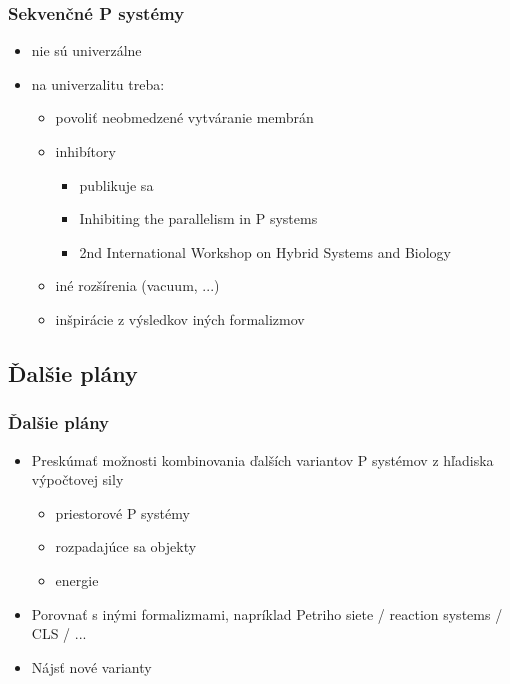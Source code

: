 \begin{frame}[t]\frametitle{Sekvenčné P systémy}
\begin{itemize}
  \item nie sú univerzálne
  \item na univerzalitu treba:
  \begin{itemize}
    \item povoliť neobmedzené vytváranie membrán \cite{Dang:2005:Sequential}
    \item inhibítory
      \begin{itemize}
        \item publikuje sa
        \item Inhibiting the parallelism in P systems
        \item 2nd International Workshop on Hybrid Systems and Biology
      \end{itemize}
    \item iné rozšírenia (vacuum, ...)
    \item inšpirácie z výsledkov iných formalizmov
  \end{itemize}
\end{itemize}
\end{frame}
\note{}


\subsection{Ďalšie plány} %
\label{sub:dalsie_plany}

\begin{frame}[t]\frametitle{Ďalšie plány}
\begin{itemize}
  \item Preskúmať možnosti kombinovania ďalších variantov P systémov z hľadiska výpočtovej sily
  \begin{itemize}
    \item priestorové P systémy
    \item rozpadajúce sa objekty
    \item energie
  \end{itemize}
  \item Porovnať s inými formalizmami, napríklad Petriho siete / reaction systems / CLS / ...
  \item Nájsť nové varianty
\end{itemize}
\end{frame}
\note{}


